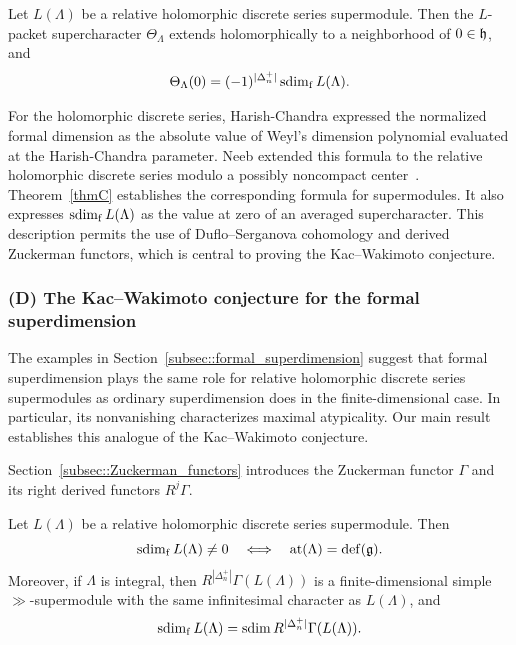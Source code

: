 \begin{bigthm}\label{thmC}
Let $L(\Lambda)$ be a relative holomorphic discrete series supermodule. Then the $L$-packet supercharacter
$\Theta_\Lambda$ extends holomorphically to a neighborhood of $0\in{\mathfrak h}$, and
\begin{equation*}
\Theta_\Lambda(0)
=
(-1)^{|\Delta_n^+|}\operatorname{sdim}_{\mathrm f} L(\Lambda).
\end{equation*}
\end{bigthm}

For the holomorphic discrete series, Harish-Chandra expressed the normalized formal dimension as the absolute value of Weyl's dimension polynomial evaluated at the Harish-Chandra parameter. Neeb extended this formula to the relative holomorphic discrete series modulo a possibly noncompact center~\cite[Theorem~3.17]{NeebSquareIntegrable}. Theorem~\ref{thmC} establishes the corresponding formula for supermodules. It also expresses $\operatorname{sdim}_{\mathrm f} L(\Lambda)$ as the value at zero of an averaged supercharacter. This description permits the use of Duflo--Serganova cohomology and derived Zuckerman functors, which is central to proving the Kac--Wakimoto conjecture.

\subsubsection*{(D) The Kac--Wakimoto conjecture for the formal superdimension}
The examples in Section~\ref{subsec::formal_superdimension} suggest that formal superdimension plays the same role for relative holomorphic discrete series supermodules as ordinary superdimension does in the finite-dimensional case. In particular, its nonvanishing characterizes maximal atypicality. Our main result establishes this analogue of the Kac--Wakimoto conjecture.

Section~\ref{subsec::Zuckerman_functors} introduces the Zuckerman functor $\Gamma$ and its right derived functors $R^j\Gamma$.

\begin{bigthm}\label{thmD}
Let $L(\Lambda)$ be a relative holomorphic discrete series supermodule. Then
\begin{equation*}
\operatorname{sdim}_{\mathrm f} L(\Lambda)\neq0
\quad\Longleftrightarrow\quad
{\operatorname{at}}(\Lambda)={\mathrm{def}}({\mathfrak{g}}).
\end{equation*}
Moreover, if $\Lambda$ is integral, then $R^{|\Delta_n^+|}\Gamma(L(\Lambda))$ is a finite-dimensional simple $\gg$-supermodule with the same infinitesimal character as $L(\Lambda)$, and
\begin{equation*}
\operatorname{sdim}_{\mathrm f} L(\Lambda)=\operatorname{sdim} R^{|\Delta_n^+|}\Gamma(L(\Lambda)).
\end{equation*}
\end{bigthm}

